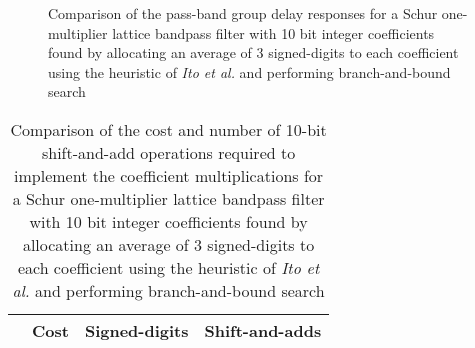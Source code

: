 \documentclass[a4paper,twoside,10pt,english]{report}
\begin{document}
\begin{figure}[!htbp]
\begin{center}
\scalebox{0.7}{}
\caption{Comparison of the pass-band group delay responses for a Schur
  one-multiplier lattice bandpass filter with 10 bit integer coefficients found
  by allocating an average of 3 signed-digits to each coefficient using the
  heuristic of \emph{Ito et al.} and performing branch-and-bound search}
\label{fig:branch-bound-schurOneMlattice-bandpass-10-nbits-delay-response}
\end{center}
\end{figure}

\begin{table}[htb]
\centering
\begin{threeparttable}
\begin{tabular}{lccc}  \\ \toprule
& Cost&Signed-digits&Shift-and-adds\\ \midrule

\bottomrule
\end{tabular}
\end{threeparttable}
\caption[Summary of cost results for the Schur one-multiplier lattice 
bandpass filter branch-and-bound algorithm example with 10 bit coefficients]
{Comparison of the cost and number of 10-bit shift-and-add operations required 
  to implement the coefficient multiplications for a Schur one-multiplier 
  lattice bandpass filter with 10 bit integer coefficients found by allocating 
  an average of 3 signed-digits to each coefficient using the heuristic of 
  \emph{Ito et al.} and performing branch-and-bound search}
\label{tab:branch-bound-schurOneMlattice-bandpass-10-nbits-cost-summary}
\end{table}
\clearpage
\end{document}
